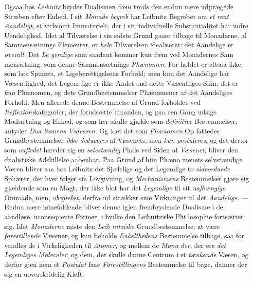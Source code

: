 Ogsaa hos \emph{Leibnitz} bryder Dualismen frem trods den
endnu mere udprægede Stræben efter Enhed. I sit \emph{Monade\-%
begreb} har Leibnitz Begrebet om \emph{et rent Aandeligt}, et
virksomt Immaterielt, der i sin individuelle Substantialitet har
indre Uendelighed. Idet al Tilværelse i sin sidste Grund gaaer
tilbage til Monaderne, al Sammensætnings Elementer, er \emph{hele}
Tilværelsen idealiseret: det Aandelige er \emph{overalt}. Det \emph{Le\-%
gemlige} som saadant kommer kun frem ved Monadernes Sam\-%
mensætning, som denne Sammensætnings \emph{Phænomen}. For\-%
holdet er altsaa ikke, som hos Spinoza, et Ligeberettigelsens
Forhold; men kun det Aandelige har Væsentlighed, det Legem\-%
lige er ikke Andet end dette Væsentliges Skin; det er \emph{kun}
Phænomen, og dets Grundbestemmelser Phænomener af det
Aandeliges Forhold. Men allerede denne Bestemmelse af Grund\-%
forholdet ved \emph{Reflexions}kategorier, der forudsætte hinanden,
og paa een Gang udsige Modsætning og Enhed, og som her
skulle gjælde som \emph{definitive} Bestemmelser, antyder \emph{Dua\-%
lismens Vedvaren}. Og idet det som \emph{Phænomen} Op\-%
fattedes Grundbestemmelser \emph{ikke deduceres} af Væsenets,
men \emph{kun postuleres}, og det derfor som \emph{uafledet} hævder
sig en \emph{selvstændig} Plads ved Siden af \emph{Væsenet}, bliver den
dualistiske Adskillelse aabenbar. Paa Grund af hiin Phæno\-%
menets selvstændige Væren bliver saa hos Leibnitz det Sjælelige
og det Legemlige to \emph{sideordnede} Sphærer, der hver følger
sin Lovgivning, og \emph{Mechanismens} Bestemmelser gjøre sig
gjældende som en Magt, der ikke blot har det \emph{Legemlige}
til sit \emph{uafhængige} Omraade, men, \emph{ubegrebet}, derfra ud\-%
strækker sine Virkninger til det \emph{Aandelige}. --- Endnu mere
iøinefaldende bliver denne igjen frembrydende Dualisme i de
aandløse, uconsequente Former, i hvilke den Leibnitziske Phi\-%
losophie fortsætter sig. Idet \emph{Monaderne} miste den \emph{Leib\-%
nitziske} Grundbestemmelse: at være \emph{forestillende} Væsener,
og kun beholde \emph{Enkelthedens} Bestemmelse tilbage, saa for\-%
vandles de i Virkeligheden til \emph{Atomer}, og mellem de \emph{Mona\-%
der}, der ere \emph{det Legemliges Moleculer}, og dem, der
skulle danne Centrum i et \emph{tænkende} Væsen, og derfor gjen\-%
nem et \emph{Postulat} faae \emph{Forestillingens} Bestemmelse til\-%
bage, danner der sig en uoverskridelig Kløft.

